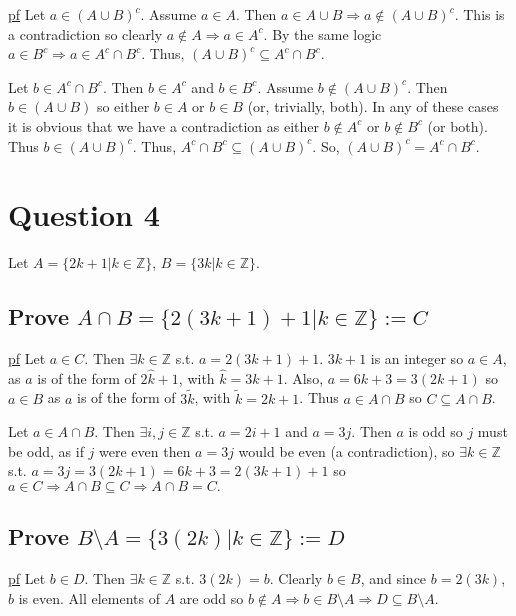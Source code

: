 \documentclass[11pt]{article} %
\begin{document}
\underline{pf} Let $a \in \left( A\cup B \right)^c$. Assume $a \in A$. Then $a \in A\cup B \Rightarrow a \notin \left( A\cup B \right)^c$. This is a contradiction so clearly $a \notin A \Rightarrow a \in A^c$. By the same logic $a \in B^c \Rightarrow a \in A^c \cap B^c$. Thus, $(A \cup B )^c \subseteq  A^c \cap B^c$.

Let $b \in A^c \cap B^c$. Then $b \in A^c$ and $b \in B^c$. Assume $b \notin (A \cup B )^c$. Then $b \in (A \cup B )$ so either $b \in A$ or $b \in B$ (or, trivially, both). In any of these cases it is obvious that we have a contradiction as either $b \notin A^c$ or $b \notin B^c$ (or both). Thus $b \in (A \cup B)^c$. Thus, $A^c \cap B^c \subseteq (A \cup B )^c $. So, $\left(A \cup B \right) ^c = A^c \cap B^c$.

\section{Question 4}
Let $A = \{ 2k + 1 | k \in \mathbb{Z} \} $, $B = \{ 3k | k \in \mathbb{Z} \}$.
\subsection{Prove $A \cap B = \{ 2(3k+1) + 1  | k \in \mathbb{Z}  \} := C $}
\underline{pf} Let $a \in C$. Then $\exists k \in \mathbb{Z}$ s.t. $ a = 2(3k+1) +1$. $3k+1$ is an integer so $a \in A $, as $a$ is of the form of $2 \hat{k}+1$, with $\hat{k} = 3k+1$. Also, $a = 6k + 3 = 3(2k+1)$ so $a \in B$ as $a$ is of the form of $3 \tilde{k}$, with $\tilde{k} = 2k+1$. Thus $a \in A \cap B $ so $C \subseteq A \cap B $.

Let $ a \in A \cap B$. Then $\exists i,j \in \mathbb{Z}$ s.t. $a = 2i+1$ and $a = 3j$. Then $a$ is odd so $j$ must be odd, as if $j$ were even then $a = 3j$ would be even (a contradiction), so $\exists k \in \mathbb{Z}$ s.t. $a = 3j = 3(2k+1) = 6k +3 = 2(3k+1)+1$ so $a \in C \Rightarrow A \cap B \subseteq C \Rightarrow A \cap B = C.$

\subsection{ Prove $B \setminus A = \{ 3(2k)  | k \in \mathbb{Z} \} := D$ }
\underline{pf} Let $b \in D$. Then $\exists k \in \mathbb{Z}$ s.t. $3(2k) = b$. Clearly $b \in B$, and since $b = 2(3k)$, $b$ is even. All elements of $A$ are odd so $b \notin A \Rightarrow b \in B \setminus A \Rightarrow D \subseteq B\setminus A$. 
\end{document}
